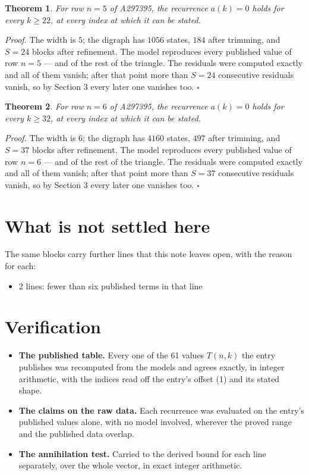 \documentclass[11pt]{article}
\newtheorem{theorem}{Theorem}
\theoremstyle{definition}
\begin{document}
\begin{theorem} For row $n = 5$ of A297395, the recurrence $a(k) = 0$ holds for every $k \ge 22$, at every index at which it can be stated.\end{theorem}

{\itshape Proof.} The width is $5$; the digraph has $1056$ states, $184$ after trimming, and $S = 24$ blocks after refinement. The model reproduces every published value of row $n = 5$ --- and of the rest of the triangle. The residuals were computed exactly and all of them vanish; after that point more than $S = 24$ consecutive residuals vanish, so by Section 3 every later one vanishes too. $\square$

\begin{theorem} For row $n = 6$ of A297395, the recurrence $a(k) = 0$ holds for every $k \ge 32$, at every index at which it can be stated.\end{theorem}

{\itshape Proof.} The width is $6$; the digraph has $4160$ states, $497$ after trimming, and $S = 37$ blocks after refinement. The model reproduces every published value of row $n = 6$ --- and of the rest of the triangle. The residuals were computed exactly and all of them vanish; after that point more than $S = 37$ consecutive residuals vanish, so by Section 3 every later one vanishes too. $\square$

\section{What is not settled here}

The same blocks carry further lines that this note leaves open, with the reason for each:

\begin{itemize}

\item 2 lines: fewer than six published terms in that line

\end{itemize}

\section{Verification}

\begin{itemize}

\item {\bfseries The published table.} Every one of the 61 values $T(n,k)$ the entry publishes was recomputed from the models and agrees exactly, in integer arithmetic, with the indices read off the entry's offset (1) and its stated shape.

\item {\bfseries The claims on the raw data.} Each recurrence was evaluated on the entry's published values alone, with no model involved, wherever the proved range and the published data overlap.

\item {\bfseries The annihilation test.} Carried to the derived bound for each line separately, over the whole vector, in exact integer arithmetic.

\end{itemize}
\end{document}
